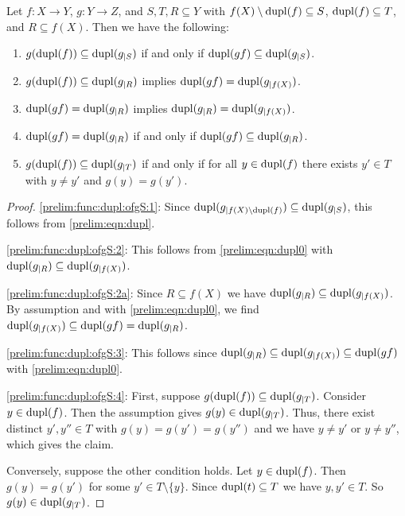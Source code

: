 \begin{proposition} \label{prelim:func:dupl:ofgS}
	Let $f \colon X \to Y$, $g \colon Y \to Z$,
	and $S, T, R \subseteq Y$ 
	with $f(X) \setminus \dupl{f} \subseteq S$, $\dupl{f} \subseteq T$,
	and $R \subseteq f(X)$.
	Then we have the following:
	
	\begin{enumerate}
		\item \label{prelim:func:dupl:ofgS:1} $g(\dupl{f}) \subseteq \dupl{g_{|S}}$
		if and only if $\dupl{\concat{f}{g}} \subseteq \dupl{g_{|S}}$.
		
		\item \label{prelim:func:dupl:ofgS:2} $g(\dupl{f}) \subseteq \dupl{g_{|R}}$
		implies $\dupl{\concat{f}{g}} = \dupl{g_{|f(X)}}$.
		
		\item \label{prelim:func:dupl:ofgS:2a} $\dupl{\concat{f}{g}} = \dupl{g_{|R}}$
		implies $\dupl{g_{|R}} = \dupl{g_{|f(X)}}$.		
		
		\item \label{prelim:func:dupl:ofgS:3} $\dupl{\concat{f}{g}} = \dupl{g_{|R}}$
		if and only if $\dupl{\concat{f}{g}} \subseteq \dupl{g_{|R}}$.
		
		\item \label{prelim:func:dupl:ofgS:4} $g(\dupl{f}) \subseteq \dupl{g_{|T}}$ 
		if and only if for all $y \in \dupl{f}$
		there exists $y ' \in T$ with $y \ne y'$ 
		and $g(y) = g(y')$.
	\end{enumerate}	
\end{proposition}
\begin{proof}
	\ref{prelim:func:dupl:ofgS:1}: Since $\dupl{g_{|f(X) \setminus \dupl{f}}} \subseteq \dupl{g_{|S}}$,
	this follows from \cref{prelim:eqn:dupl}.
		
	\ref{prelim:func:dupl:ofgS:2}: This follows from 
	\cref{prelim:eqn:dupl0}
	with $\dupl{g_{|R}} \subseteq \dupl{g_{|f(X)}}$.
	
	\ref{prelim:func:dupl:ofgS:2a}: 
	Since $R \subseteq f(X)$
	we have $\dupl{g_{|R}} \subseteq \dupl{g_{|f(X)}}$.
	By assumption and with 	\cref{prelim:eqn:dupl0},
	we find $\dupl{g_{|f(X)}} \subseteq \dupl{\concat{f}{g}} = \dupl{g_{|R}}$.	
	
	\ref{prelim:func:dupl:ofgS:3}: This follows since $\dupl{g_{|R}} \subseteq \dupl{g_{|f(X)}} \subseteq \dupl{\concat{f}{g}}$
	with \cref{prelim:eqn:dupl0}.
	
	\ref{prelim:func:dupl:ofgS:4}: First, suppose $g(\dupl{f}) \subseteq \dupl{g_{|T}}$.
	Consider $y \in \dupl{f}$. Then the assumption gives $g(y) \in \dupl{g_{|T}}$.
	Thus, there exist distinct $y', y'' \in T$ with $g(y) = g(y') = g(y'')$
	and we have $y \ne y'$ or $y \ne y''$, which gives the claim.
	
	Conversely, suppose the other condition holds.
	Let $y \in \dupl{f}$. Then $g(y) = g(y')$ for some $y' \in T \setminus \{y\}$.
	Since $\dupl{t} \subseteq T$ we have $y,y' \in T$. So $g(y) \in \dupl{g_{|T}}$.
\end{proof}

